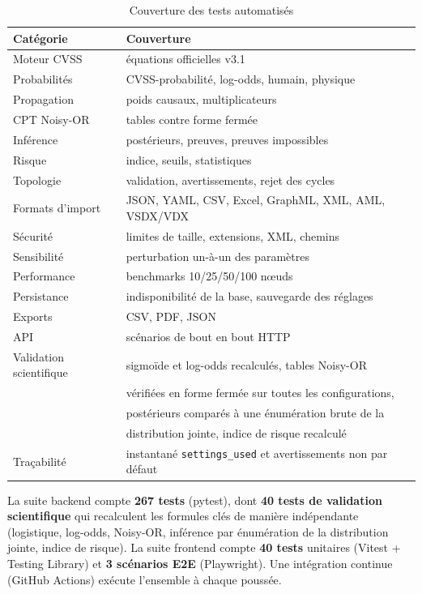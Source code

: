 \documentclass[12pt,a4paper]{article}
\begin{document}
\begin{table}[H]
\centering
\caption{Couverture des tests automatisés}
\label{tab:tests}
\begin{tabularx}{\textwidth}{p{5.2cm} X}
\toprule
\textbf{Catégorie} & \textbf{Couverture} \\
\midrule
Moteur CVSS & équations officielles v3.1 \\
Probabilités & CVSS-probabilité, log-odds, humain, physique \\
Propagation & poids causaux, multiplicateurs \\
CPT Noisy-OR & tables contre forme fermée \\
Inférence & postérieurs, preuves, preuves impossibles \\
Risque & indice, seuils, statistiques \\
Topologie & validation, avertissements, rejet des cycles \\
Formats d'import & JSON, YAML, CSV, Excel, GraphML, XML, AML, VSDX/VDX \\
Sécurité & limites de taille, extensions, XML, chemins \\
Sensibilité & perturbation un-à-un des paramètres \\
Performance & benchmarks 10/25/50/100 nœuds \\
Persistance & indisponibilité de la base, sauvegarde des réglages \\
Exports & CSV, PDF, JSON \\
API & scénarios de bout en bout HTTP \\
Validation scientifique & sigmoïde et log-odds recalculés, tables Noisy-OR \\
& vérifiées en forme fermée sur toutes les configurations, \\
& postérieurs comparés à une énumération brute de la \\
& distribution jointe, indice de risque recalculé \\
Traçabilité & instantané \texttt{settings\_used} et avertissements non par défaut \\
\bottomrule
\end{tabularx}
\end{table}

La suite backend compte \textbf{267 tests} (pytest), dont \textbf{40 tests de validation scientifique} qui recalculent les formules clés de manière indépendante (logistique, log-odds, Noisy-OR, inférence par énumération de la distribution jointe, indice de risque). La suite frontend compte \textbf{40 tests} unitaires (Vitest + Testing Library) et \textbf{3 scénarios E2E} (Playwright). Une intégration continue (GitHub Actions) exécute l'ensemble à chaque poussée.
\end{document}
